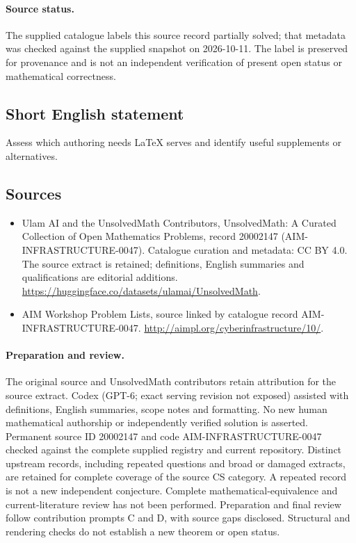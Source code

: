 \documentclass[11pt]{article}
\begin{document}
\paragraph{Source status.}
The supplied catalogue labels this source record partially solved; that metadata was checked against the supplied snapshot on 2026-10-11. The label is preserved for provenance and is not an independent verification of present open status or mathematical correctness.
\subsection{Short English statement}
Assess which authoring needs LaTeX serves and identify useful supplements or alternatives.
\subsection{Sources}
\begin{itemize}
\item[\hypertarget{source:20002147:1}{S1}] Ulam AI and the UnsolvedMath Contributors, UnsolvedMath: A Curated Collection of Open Mathematics Problems, record 20002147 (AIM-INFRASTRUCTURE-0047). Catalogue curation and metadata: CC BY 4.0. The source extract is retained; definitions, English summaries and qualifications are editorial additions.
\url{https://huggingface.co/datasets/ulamai/UnsolvedMath}.
\item[\hypertarget{source:20002147:2}{S2}] AIM Workshop Problem Lists, source linked by catalogue record AIM-INFRASTRUCTURE-0047.
\url{http://aimpl.org/cyberinfrastructure/10/}.
\end{itemize}
\paragraph{Preparation and review.}
The original source and UnsolvedMath contributors retain attribution for the source extract. Codex (GPT-6; exact serving revision not exposed) assisted with definitions, English summaries, scope notes and formatting. No new human mathematical authorship or independently verified solution is asserted. Permanent source ID 20002147 and code AIM-INFRASTRUCTURE-0047 checked against the complete supplied registry and current repository. Distinct upstream records, including repeated questions and broad or damaged extracts, are retained for complete coverage of the source CS category. A repeated record is not a new independent conjecture. Complete mathematical-equivalence and current-literature review has not been performed. Preparation and final review follow contribution prompts C and D, with source gaps disclosed. Structural and rendering checks do not establish a new theorem or open status.
\label{end:20002147}
\end{document}
